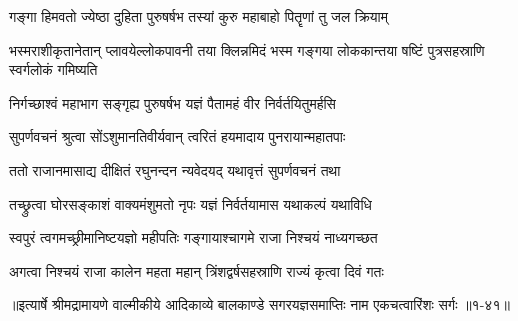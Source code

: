 \twolineshloka
{गङ्गा हिमवतो ज्येष्ठा दुहिता पुरुषर्षभ}
{तस्यां कुरु महाबाहो पितॄणां तु जल क्रियाम्} %

\threelineshloka
{भस्मराशीकृतानेतान् प्लावयेल्लोकपावनी}
{तया क्लिन्नमिदं भस्म गङ्गया लोककान्तया}
{षष्टिं पुत्रसहस्राणि स्वर्गलोकं गमिष्यति} %

\twolineshloka
{निर्गच्छाश्वं महाभाग सङ्गृह्य पुरुषर्षभ}
{यज्ञं पैतामहं वीर निर्वर्तयितुमर्हसि} %

\twolineshloka
{सुपर्णवचनं श्रुत्वा सोंऽशुमानतिवीर्यवान्}
{त्वरितं हयमादाय पुनरायान्महातपाः} %

\twolineshloka
{ततो राजानमासाद्य दीक्षितं रघुनन्दन}
{न्यवेदयद् यथावृत्तं सुपर्णवचनं तथा} %

\twolineshloka
{तच्छ्रुत्वा घोरसङ्काशं वाक्यमंशुमतो नृपः}
{यज्ञं निर्वर्तयामास यथाकल्पं यथाविधि} %

\twolineshloka
{स्वपुरं त्वगमच्छ्रीमानिष्टयज्ञो महीपतिः}
{गङ्गायाश्चागमे राजा निश्चयं नाध्यगच्छत} %

\twolineshloka
{अगत्वा निश्चयं राजा कालेन महता महान्}
{त्रिंशद्वर्षसहस्राणि राज्यं कृत्वा दिवं गतः} %


॥इत्यार्षे श्रीमद्रामायणे वाल्मीकीये आदिकाव्ये बालकाण्डे सगरयज्ञसमाप्तिः नाम एकचत्वारिंशः सर्गः ॥१-४१॥

